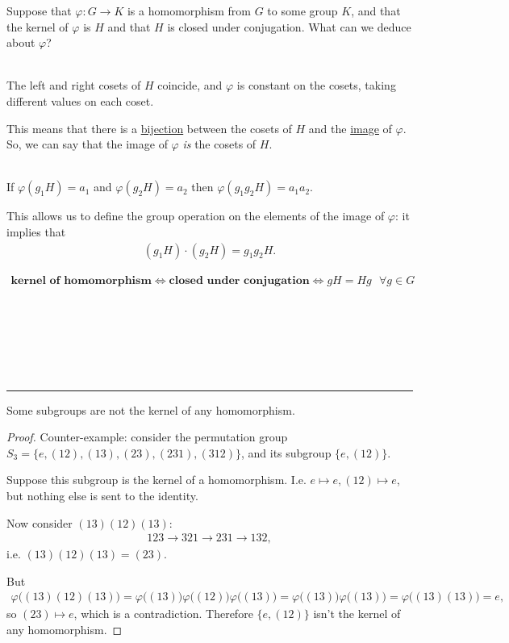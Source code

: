 Suppose that $\varphi:G \to K$ is a homomorphism from $G$ to some group $K$,
and that the kernel of $\varphi$ is $H$ and that $H$ is closed under
conjugation. What can we deduce about $\varphi$?

\begin{theorem}~\\
  The left and right cosets of $H$ coincide, and $\varphi$ is constant on
  the cosets, taking different values on each coset.
\end{theorem}

This means that there is a \underline{bijection} between the cosets of $H$ and
the \underline{image} of $\varphi$. So, we can say that the image of $\varphi$
\textit{is} the cosets of $H$.

\begin{theorem}~\\
  If $\varphi(g_1H) = a_1$ and $\varphi(g_2H) = a_2$ then
  $\varphi(g_1g_2H) = a_1a_2$.
\end{theorem}

This allows us to define the group operation on the elements of the image of
$\varphi$: it implies that
\begin{align*}
  (g_1H) \cdot (g_2H) = g_1g_2H.
\end{align*}

\begin{theorem}
\begin{align*}
  \textbf{kernel of homomorphism} \iff \textbf{closed under conjugation} \iff gH = Hg ~~~ \forall g \in G
\end{align*}
\end{theorem}

~\\~\\~\\~\\~\\
\hrule
\begin{theorem*}
  Some subgroups are not the kernel of any homomorphism.
\end{theorem*}

\begin{proof} \label{some-subgroups-not-kernel}
Counter-example: consider the permutation group
$S_3 = \{e, (12), (13), (23), (231), (312)\}$, and its subgroup $\{e,
(12)\}$.

Suppose this subgroup is the kernel of a homomorphism. I.e.
$e \mapsto e, (12) \mapsto e$, but nothing else is sent to the identity.

Now consider $(13)(12)(13)$:
\begin{align*}
  123 \to 321 \to 231 \to 132,
\end{align*}
i.e. $(13)(12)(13) = (23)$.

But
\begin{align*}
  \varphi\Big((13)(12)(13)\Big) =
  \varphi\Big((13)\Big) \varphi\Big((12)\Big) \varphi\Big((13)\Big) =
  \varphi\Big((13)\Big) \varphi\Big((13)\Big) = \varphi\Big((13)(13)\Big) = e,
\end{align*}
so $(23) \mapsto e$, which is a contradiction. Therefore $\{e,(12)\}$ isn't the
kernel of any homomorphism.
\end{proof}

